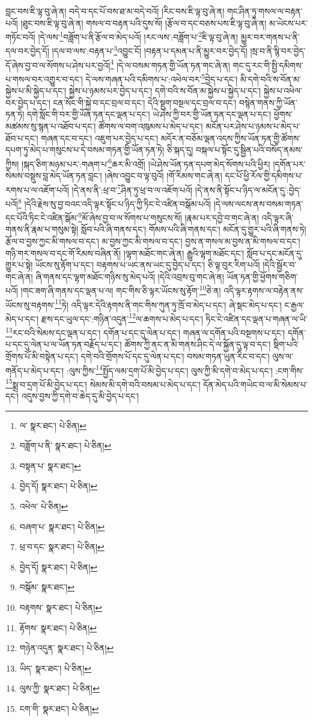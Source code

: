 བླང་བས་ཇི་ལྟ་བུ་ཞེ་ན། བདེ་བ་དང་པོ་བས་ཐ་མ་བདེ་བའོ། །རིང་བས་ཇི་ལྟ་བུ་ཞེ་ན། གང་ཤིན་ཏུ་གསལ་ལ་བརྟན་པའོ། །ཐུང་བས་ཇི་ལྟ་བུ་ཞེ་ན། གསལ་བ་བརྟན་པའི་དུས་སོ། །རྩོལ་བ་དང་བཅས་པས་ཇི་ལྟ་བུ་ཞེ་ན། མ་ཡེངས་པར་གཏོང་བའོ། །དེ་ལས་\footnote{ལ་  སྣར་ཐང་།  པེ་ཅིན། }བཟློག་པ་ནི་རྩོལ་བ་མེད་པའོ། །རང་ལས་:བཟློག་པ་\footnote{བཟློག་པ་ནི་  སྣར་ཐང་།  པེ་ཅིན། }ཇི་ལྟ་བུ་ཞེ་ན། མྱུར་བར་གནས་པ་ནི་དལ་བར་བྱེད་དོ། །དལ་བ་ལས་:བརྟན་པ་\footnote{བསྟན་པ་  སྣར་ཐང་། }འབྱུང་ངོ། །བརྟན་པ་དམན་པ་ནི་མྱུར་བར་བྱེད་དོ། །སྲ་བ་ནི་སྙི་བར་བྱེད་དོ་ཞེས་བྱ་བ་ལ་སོགས་པ་ཤེས་པར་བྱའོ།\footnote{བྱེད་དོ།  སྣར་ཐང་།  པེ་ཅིན། } །དེ་ལ་བསམ་གཏན་གྱི་ཡོན་ཏན་གང་ཞེ་ན། གང་དུ་རང་གི་སྤྱི་དམིགས་པ་གསལ་བར་འགྱུར་བ་དང་། དེ་ལས་གཞན་པའི་དམིགས་པ་:འཕེལ་བར་\footnote{འཕེལ་  པེ་ཅིན། }བྱེད་པ་དང་། མི་དགེ་བའི་ས་བོན་མ་སྐྱེས་པ་མི་སྐྱེད་པ་དང་། སྐྱེས་པ་ཉམས་པར་བྱེད་པ་དང་། དགེ་བའི་ས་བོན་མ་སྐྱེས་པ་སྐྱེད་པ་དང་། སྐྱེས་པ་འཕེལ་བར་བྱེད་པ་དང་། ངན་སོང་གི་སྐྱེ་བ་དང་བྲལ་བ་དང་། དེའི་སྡུག་བསྔལ་དང་བྲལ་བ་དང་། བསྙེན་གནས་ཀྱི་ཡོན་ཏན་ཏེ། དགེ་སློང་གི་བར་གྱི་ཡོན་ཏན་དང་ལྡན་པ་དང་། ཡེ་ཤེས་ཀྱི་བར་གྱི་ཡོན་ཏན་དང་ལྡན་པ་དང་། ཕྱོགས་མཚམས་སུ་སྙན་པ་འཐོབ་པ་དང་། ཚོགས་ལ་བག་འཁུམས་པ་མེད་པ་དང་། མངོན་པར་ཤེས་པ་ཉམས་པ་མེད་པ་ཐོབ་པ་དང་། གཞན་དང་བ་དང་། འཇུག་པར་བྱེད་པ་དང་། མདོར་ན་བཅོམ་ལྡན་འདས་ཀྱིས་ཡོན་ཏན་གྱི་ཚོགས་དཔག་ཏུ་མེད་པ་གསུངས་པ་དེ་བསམ་གཏན་གྱི་ཡོན་ཏན་ཏེ། ཅི་སྐད་དུ། བསྐལ་པ་སྟོང་དུ་སྦྱིན་པའི་བསོད་ནམས་ཀྱིས། །སྐད་ཅིག་མཉམ་པར་:གཞག་པ་\footnote{བཞག་པ་  སྣར་ཐང་།  པེ་ཅིན། }ཆར་མི་འགྲོ། །ཡེ་ཤེས་ཡོན་ཏན་དཔག་མེད་སོགས་པའི་ཕྱིར། །དགོན་པར་སེམས་བསྡུས་བླ་མེད་ཡོན་ཏན་བླང་། །ཞེས་འབྱུང་བ་ལྟ་བུའོ། །གོ་རིམས་གང་ཞེ་ན། དང་པོ་ཕྱི་རོལ་གྱི་དམིགས་པ་རགས་པ་ལ་འཇོག་པའོ། །དེ་ནས་ནི་:ཕྲ་བ་\footnote{ཕྲ་བ་དང་  སྣར་ཐང་།  པེ་ཅིན། }ཤིན་ཏུ་ཕྲ་བ་ལ་འཇོག་པའོ། །དེ་ནས་ནི་སྟོང་པ་ཉིད་ལ་མངོན་དུ་:བྱེད་པའོ།\footnote{བྱེད་དོ།  སྣར་ཐང་།  པེ་ཅིན། } །དེའི་རྗེས་སུ་བྱ་བའང་འདི་ལྟར་སྟོང་པ་ཉིད་ཀྱི་ཏིང་ངེ་འཛིན་བསྒོམ་པའོ། །དེ་ལས་ལངས་ནས་བསམ་གཏན་དང་པོའི་ཏིང་ངེ་འཛིན་སྒོམ་\footnote{བསྒོམ་  སྣར་ཐང་། }མོ་ཞེས་བྱ་བ་ལ་སོགས་པ་གསུངས་སོ། །རྣམ་པར་དབྱེ་བ་གང་ཞེ་ན། འདི་ལྟར་ཞི་གནས་ནི་རྣམ་པ་གསུམ་སྟེ། སློབ་པའི་ཞི་གནས་དང་། གོམས་པའི་ཞི་གནས་དང་། མངོན་དུ་གྱུར་པའི་ཞི་གནས་ཏེ། རྩོལ་བ་བྱས་ཀྱང་མི་གསལ་བ་དང་། མ་བྱས་ཀྱང་མི་གསལ་བ་དང་། བྱས་ན་གསལ་མ་བྱས་ན་མི་གསལ་བ་དང་། གཉི་གར་གསལ་བ་དང་གོ་རིམས་བཞིན་ནོ། །ལྷག་མཐོང་གང་ཞེ་ན། རྒྱུའི་ལྷག་མཐོང་དང་། སློབ་པ་དང་མངོན་དུ་གྱུར་པ་སྟེ། ཡོངས་སུ་རྟོག་པ་དང་། བརྟགས་པ་ཡང་ནས་ཡང་དུ་བྱེད་པ་དང་། ཅི་ལྟ་བུར་རིག་པའོ། །དེའི་སྦྱོར་བ་གང་ཞེ་ན། ཞི་གནས་དང་ལྷག་མཐོང་གཉིས་སུ་མེད་པའོ། །དེའི་འབྲས་བུ་གང་ཞེ་ན། ཡོན་ཏན་གྱི་ཕྱོགས་གཅིག་པའོ། །གང་ཟག་ཞི་གནས་དང་ལྡན་པ་ལ། གང་གིས་ཅི་ལྟར་ཡོངས་སུ་རྟོག་\footnote{བརྟགས་  སྣར་ཐང་།  པེ་ཅིན། }ཅེ་ན། འདི་ལྟར་རྟགས་ལ་བརྟེན་ནས་ཡོངས་སུ་བརྟགས་\footnote{རྟོགས་  སྣར་ཐང་།  པེ་ཅིན། }ཏེ། འདི་ལྟར་དེའི་རྟགས་ནི་གང་གིས་ཀུན་ཏུ་ཁྲོ་བ་མེད་པ་དང་། ཞེ་སྡང་མེད་པ་དང་། ང་རྒྱལ་མེད་པ་དང་། རྫས་དང་ཡུལ་དང་:གཉིན་འདུན་\footnote{གཉེན་འདུན་  སྣར་ཐང་།  པེ་ཅིན། }ལ་ཆགས་པ་མེད་པ་དང་། ཏིང་ངེ་འཛིན་དང་ལྡན་པ་གཞན་ལ་ཡི་\footnote{ཡིད་  སྣར་ཐང་།  པེ་ཅིན། }རང་བའི་སེམས་དང་ལྡན་པ་དང་། དགོན་པ་དང་དུ་ལེན་པ་དང་། གཞན་ལ་དགོན་པའི་བསྔགས་པ་དང་། དགོན་པ་དང་དུ་ལེན་པ་ལ་ཡོན་ཏན་བརྗོད་པ་དང་། ཚོགས་ཀྱི་ནང་ན་མི་གནས་ཤིང་དེ་ལ་སྐྱོན་དུ་ལྟ་བ་དང་། སྡིག་པའི་གྲོགས་པོ་མི་བསྟེན་པ་དང་། དགེ་བའི་གྲོགས་པོ་དང་དུ་ལེན་པ་དང་། བསམ་གཏན་ཡུན་རིང་བ་དང་། ལུས་ལ་གནོད་པ་མེད་པ་དང་། :ལུས་ཀྱིས་\footnote{ལུས་ཀྱི་  སྣར་ཐང་།  པེ་ཅིན། }སྤྱོད་ལམ་དྲག་པོ་མི་བྱེད་པ་དང་། ལུས་ཀྱི་མི་དགེ་བ་མེད་པ་དང་། :ངག་གིས་\footnote{ངག་གི་  སྣར་ཐང་།  པེ་ཅིན། }སྨྲ་བ་དྲག་པོ་མི་བྱེད་པ་དང་། སེམས་མི་དགེ་བའི་བསམ་པ་མེད་པ་དང་། དོན་མེད་པའི་གཡེང་བ་ལ་མི་སེམས་པ་དང་། འདུས་བྱས་ཀྱི་དགེ་བ་ཆེད་དུ་མི་བྱེད་པ་དང་། 